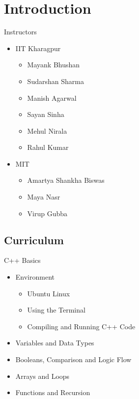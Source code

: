 \section{Introduction}

\begin{frame}{Instructors}{}
\begin{itemize}
	\item IIT Kharagpur
	\begin{itemize}
		\item Mayank Bhushan
		\item Sudarshan Sharma
		\item Manish Agarwal
		\item Sayan Sinha
		\item Mehul Nirala
		\item Rahul Kumar
	\end{itemize}
	\item MIT
	\begin{itemize}
		\item Amartya Shankha Biswas
		\item Maya Nasr
		\item Virup Gubba
	\end{itemize}
\end{itemize}
\end{frame}

\subsection{Curriculum}
\begin{frame}{C++ Basics}{}
\begin{itemize}
	\item Environment
	\begin{itemize}
		\item Ubuntu Linux
        \item Using the Terminal
        \item Compiling and Running C++ Code
	\end{itemize}
    \item Variables and Data Types
    \item Booleans, Comparison and Logic Flow
    \item Arrays and Loops
    \item Functions and Recursion
\end{itemize}
\end{frame}

